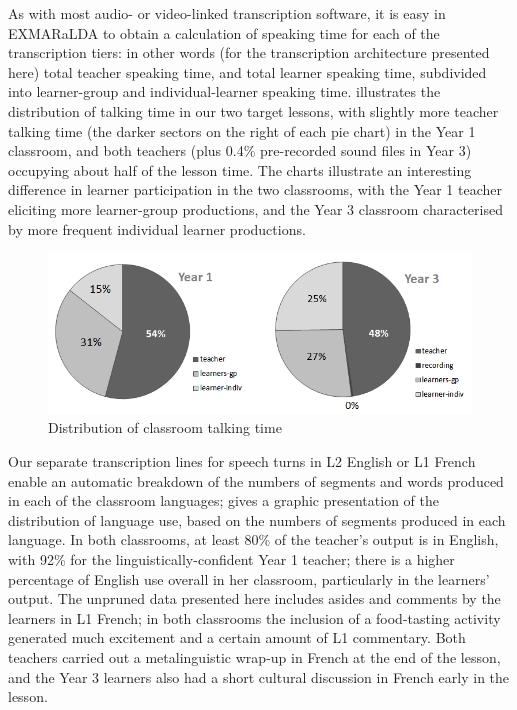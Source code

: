 \documentclass[output=paper,colorlinks,citecolor=brown,modfonts,nonflat]{../langscibook}
\begin{document}
As with most audio- or video-linked transcription software, it is easy in EXMARaLDA to obtain a calculation of speaking time for each of the transcription tiers: in other words (for the transcription architecture presented here) total teacher speaking time, and total learner speaking time, subdivided into learner-group and individual-learner speaking time.  illustrates the distribution of talking time in our two target lessons, with slightly more teacher talking time (the darker sectors on the right of each pie chart) in the Year 1 classroom, and both teachers (plus 0.4\% pre-recorded sound files in Year 3) occupying about half of the lesson time. The charts illustrate an interesting difference in learner participation in the two classrooms, with the Year 1 teacher eliciting more learner-group productions, and the Year 3 classroom characterised by more frequent individual learner productions.

\begin{figure}
\caption{\label{fig:hilton:2}Distribution of classroom talking time}
\includegraphics[width=\textwidth]{figures/hilton-img002.png}
\end{figure}

Our separate transcription lines for speech turns in L2 English or L1 French enable an automatic breakdown of the numbers of segments and words produced in each of the classroom languages;  gives a graphic presentation of the distribution of language use, based on the numbers of segments produced in each language. In both classrooms, at least 80\% of the teacher’s output is in English, with 92\% for the linguistically-confident Year 1 teacher; there is a higher percentage of English use overall in her classroom, particularly in the learners’ output. The unpruned data presented here includes asides and comments by the learners in L1 French; in both classrooms the inclusion of a food-tasting activity generated much excitement and a certain amount of L1 commentary. Both teachers carried out a metalinguistic wrap-up in French at the end of the lesson, and the Year 3 learners also had a short cultural discussion in French early in the lesson.
\end{document}
